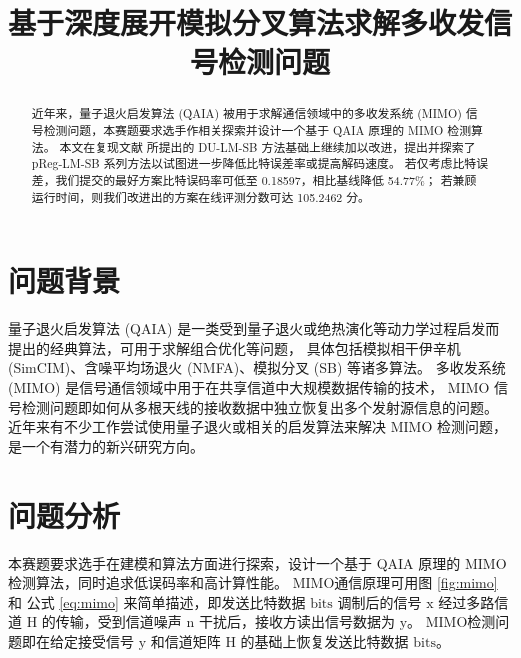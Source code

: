 \documentclass[withoutpreface,bwprint]{cumcmthesis}
\title{基于深度展开模拟分叉算法求解多收发信号检测问题}
\begin{document}
\maketitle
\begin{abstract}
近年来，量子退火启发算法 (QAIA) 被用于求解通信领域中的多收发系统 (MIMO) 信号检测问题，本赛题要求选手作相关探索并设计一个基于 QAIA 原理的 MIMO 检测算法。
本文在复现文献 \cite{Takabe2023} 所提出的 DU-LM-SB 方法基础上继续加以改进，提出并探索了 pReg-LM-SB 系列方法以试图进一步降低比特误差率或提高解码速度。
若仅考虑比特误差，我们提交的最好方案比特误码率可低至 0.18597，相比基线降低 54.77\%；
若兼顾运行时间，则我们改进出的方案在线评测分数可达 105.2462 分。

\end{abstract}




\section{问题背景}

量子退火启发算法 (QAIA) 是一类受到量子退火或绝热演化等动力学过程启发而提出的经典算法，可用于求解组合优化等问题，
具体包括模拟相干伊辛机 (SimCIM)、含噪平均场退火 (NMFA)、模拟分叉 (SB) 等诸多算法。
多收发系统 (MIMO) 是信号通信领域中用于在共享信道中大规模数据传输的技术，
MIMO 信号检测问题即如何从多根天线的接收数据中独立恢复出多个发射源信息的问题。
近年来有不少工作尝试使用量子退火或相关的启发算法来解决 MIMO 检测问题，是一个有潜力的新兴研究方向。


\section{问题分析}

本赛题要求选手在建模和算法方面进行探索，设计一个基于 QAIA 原理的 MIMO 检测算法，同时追求低误码率和高计算性能。
MIMO通信原理可用图 \ref{fig:mimo} 和 公式 \ref{eq:mimo} 来简单描述，即发送比特数据 $ \mathrm{bits} $ 调制后的信号 $ \mathrm{x} $ 经过多路信道 $ \mathrm{H} $ 的传输，受到信道噪声 $ \mathrm{n} $ 干扰后，接收方读出信号数据为 $ \mathrm{y} $。
MIMO检测问题即在给定接受信号 $ \mathrm{y} $ 和信道矩阵 $ \mathrm{H} $ 的基础上恢复发送比特数据 $ \mathrm{bits} $。
\end{document}
